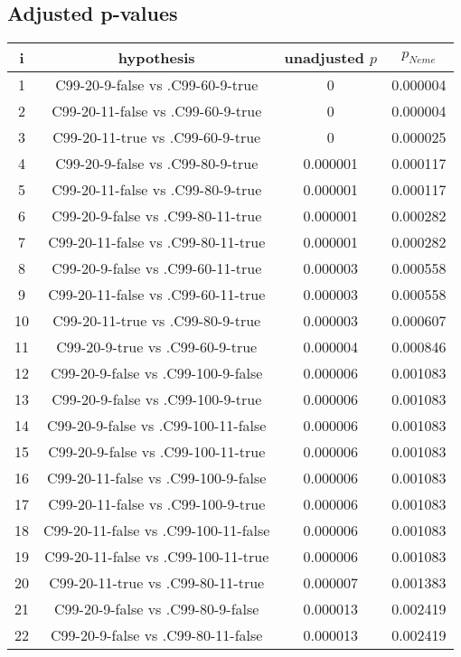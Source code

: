 \documentclass[a4paper,10pt]{article}
\begin{document}
\begin{landscape}
\pagebreak

\subsection{Adjusted p-values}

\begin{table}[!htp]
\centering\scriptsize
\begin{tabular}{cccc}
i&hypothesis&unadjusted $p$&$p_{Neme}$\\
\hline1&C99-20-9-false vs .C99-60-9-true&0&0.000004\\
2&C99-20-11-false vs .C99-60-9-true&0&0.000004\\
3&C99-20-11-true vs .C99-60-9-true&0&0.000025\\
4&C99-20-9-false vs .C99-80-9-true&0.000001&0.000117\\
5&C99-20-11-false vs .C99-80-9-true&0.000001&0.000117\\
6&C99-20-9-false vs .C99-80-11-true&0.000001&0.000282\\
7&C99-20-11-false vs .C99-80-11-true&0.000001&0.000282\\
8&C99-20-9-false vs .C99-60-11-true&0.000003&0.000558\\
9&C99-20-11-false vs .C99-60-11-true&0.000003&0.000558\\
10&C99-20-11-true vs .C99-80-9-true&0.000003&0.000607\\
11&C99-20-9-true vs .C99-60-9-true&0.000004&0.000846\\
12&C99-20-9-false vs .C99-100-9-false&0.000006&0.001083\\
13&C99-20-9-false vs .C99-100-9-true&0.000006&0.001083\\
14&C99-20-9-false vs .C99-100-11-false&0.000006&0.001083\\
15&C99-20-9-false vs .C99-100-11-true&0.000006&0.001083\\
16&C99-20-11-false vs .C99-100-9-false&0.000006&0.001083\\
17&C99-20-11-false vs .C99-100-9-true&0.000006&0.001083\\
18&C99-20-11-false vs .C99-100-11-false&0.000006&0.001083\\
19&C99-20-11-false vs .C99-100-11-true&0.000006&0.001083\\
20&C99-20-11-true vs .C99-80-11-true&0.000007&0.001383\\
21&C99-20-9-false vs .C99-80-9-false&0.000013&0.002419\\
22&C99-20-9-false vs .C99-80-11-false&0.000013&0.002419\\

\end{tabular}
\end{table}
\end{landscape}
\end{document}
